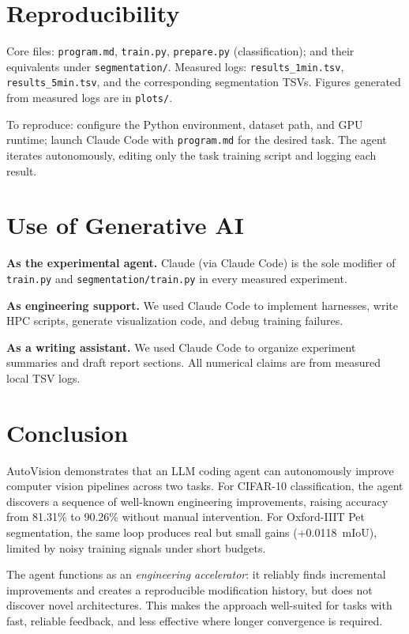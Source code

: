 \documentclass[10pt,twocolumn,letterpaper]{article}
\begin{document}
\section{Reproducibility}

Core files: \texttt{program.md}, \texttt{train.py},
\texttt{prepare.py} (classification); and their equivalents under
\texttt{segmentation/}.
Measured logs: \texttt{results\_1min.tsv}, \texttt{results\_5min.tsv},
and the corresponding segmentation TSVs.
Figures generated from measured logs are in \texttt{plots/}.

To reproduce: configure the Python environment, dataset path, and GPU
runtime; launch Claude Code with \texttt{program.md} for the desired
task.
The agent iterates autonomously, editing only the task training script
and logging each result.

\section{Use of Generative AI}

\textbf{As the experimental agent.}
Claude (via Claude Code) is the sole modifier of \texttt{train.py}
and \texttt{segmentation/train.py} in every measured experiment.

\textbf{As engineering support.}
We used Claude Code to implement harnesses, write HPC scripts,
generate visualization code, and debug training failures.

\textbf{As a writing assistant.}
We used Claude Code to organize experiment summaries and draft report
sections.
All numerical claims are from measured local TSV logs.

\section{Conclusion}

AutoVision demonstrates that an LLM coding agent can autonomously
improve computer vision pipelines across two tasks.
For CIFAR-10 classification, the agent discovers a sequence of
well-known engineering improvements, raising accuracy from 81.31\% to
90.26\% without manual intervention.
For Oxford-IIIT Pet segmentation, the same loop produces real but
small gains (+0.0118~mIoU), limited by noisy training signals under
short budgets.

The agent functions as an \emph{engineering accelerator}: it reliably
finds incremental improvements and creates a reproducible modification
history, but does not discover novel architectures.
This makes the approach well-suited for tasks with fast, reliable
feedback, and less effective where longer convergence is required.

{\small
  
  
}
\end{document}
